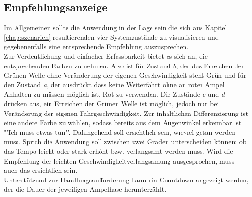 \subsection{Empfehlungsanzeige}
Im Allgemeinen sollte die Anwendung in der Lage sein die sich aus Kapitel \ref{chap:szenarien} resultierenden vier Systemzustände zu visualisieren und gegebenenfalls eine entsprechende Empfehlung auszusprechen.\\
Zur Verdeutlichung und einfacher Erfassbarkeit bietet es sich an, die entsprechenden Farben zu nehmen. Also ist für Zustand \textit{b}, der das Erreichen der Grünen Welle ohne Veränderung der eigenen Geschwindigkeit steht Grün und für den Zustand \textit{a}, der ausdrückt dass keine Weiterfahrt ohne an roter Ampel Anhalten zu müssen möglich ist, Rot zu verwenden.
Die Zustände \textit{c} und \textit{d} drücken aus, ein Erreichen der Grünen Welle ist möglich, jedoch nur bei Veränderung der eigenen Fahrgeschwindigkeit. Zur inhaltlichen Differenzierung ist eine andere Farbe zu wählen, sodass bereits aus dem Augenwinkel erkennbar ist "'Ich muss etwas tun"'. Dahingehend soll ersichtlich sein, wieviel getan werden muss. Sprich die Anwendung soll zwischen zwei Graden unterscheiden können: ob das Tempo leicht oder stark erhöht bzw. verlangsamt werden muss. Wird die Empfehlung der leichten Geschwindigkeitverlangsamung ausgesprochen, muss auch das ersichtlich sein.\\
Unterstützend zur Handlungsaufforderung kann ein Countdown angezeigt werden, der die Dauer der jeweiligen Ampelhase herunterzählt. 
